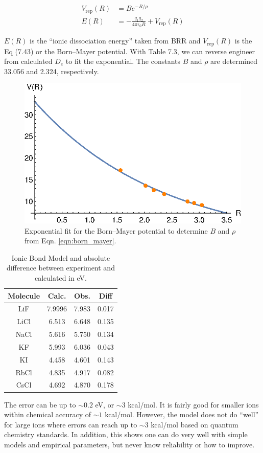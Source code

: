 \documentclass{article}
\begin{document}
  {\color{blue}
  \begin{align}
    V_{\text{rep}}(R) & = Be^{-R/\rho} \label{eqn:born_mayer}\\
    E(R) & = -\frac{q_1q_2}{4\pi\epsilon_0R} + V_{\text{rep}}(R)
    \label{eqn:dissociation}
  \end{align}

  $E(R)$ is the ``ionic dissociation energy'' taken from BRR and $V_{\text{rep}}(R)$ is
  the Eq (7.43) or the Born--Mayer potential. With Table 7.3, we can reverse engineer
  from calculated $D_e$ to fit the exponential. The constants $B$ and $\rho$ are
  determined 33.056 and 2.324, respectively.

  \begin{figure}[H]
    \centering
    \includegraphics[scale=1]{fitted_rhoB.eps}
    \caption{Exponential fit for the Born--Mayer potential to determine $B$ and
      $\rho$ from Eqn. \eqref{eqn:born_mayer}.}
    \label{fig:fit}
  \end{figure}
  
  \begin{table}[H]
    \centering
    \caption{Ionic Bond Model and absolute difference between experiment and calculated
      in eV.}
    \begin{tabular}{cccc}
      Molecule & Calc. & Obs. & Diff \\
      \hline
      LiF  & 7.9996 & 7.983 & 0.017 \\
      LiCl & 6.513  & 6.648 & 0.135 \\
      NaCl & 5.616  & 5.750 & 0.134 \\
      KF   & 5.993  & 6.036 & 0.043 \\
      KI   & 4.458  & 4.601 & 0.143 \\
      RbCl & 4.835  & 4.917 & 0.082 \\
      CsCl & 4.692  & 4.870 & 0.178
    \end{tabular}
  \end{table}
  
  The error can be up to $\sim 0.2$ eV, or $\sim 3$ kcal/mol. It is fairly good for smaller
  ions within chemical accuracy of $\sim 1$ kcal/mol. However, the model does not do ``well''
  for large ions where errors can reach up to $\sim 3$ kcal/mol based on quantum chemistry
  standards. In addition, this shows one can do very well with simple models and empirical
  parameters, but never know reliability or how to improve.}
\end{document}
